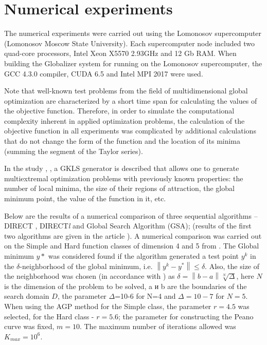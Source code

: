 \documentclass{svproc}
\begin{document}
\section{Numerical experiments}

The numerical experiments were carried out using the Lomonosov supercomputer (Lomonosov Moscow State University). Each supercomputer node included two quad-core processors, Intel Xeon X5570 2.93GHz and 12 Gb RAM. When building the Globalizer system for running on the Lomonosov supercomputer, the GCC 4.3.0 compiler, CUDA 6.5 and Intel MPI 2017 were used.

Note that well-known test problems from the field of multidimensional global optimization are characterized by a short time span for calculating the values of the objective function. Therefore, in order to simulate the computational complexity inherent in applied optimization problems, the calculation of the objective function in all experiments was complicated by additional calculations that do not change the form of the function and the location of its minima (summing the segment of the Taylor series).

In the study \cite{Gaviano2003}, \cite{Ref16}, a GKLS generator is described that allows one to generate multiextremal optimization problems with previously known properties: the number of local minima, the size of their regions of attraction, the global minimum point, the value of the function in it, etc.

Below are the results of a numerical comparison of three sequential algorithms -- DIRECT \cite{Jones2009}, DIRECT\textit{l} \cite{Gablonsky2001} and Global Search Algorithm (GSA); (results of the first two algorithms are given in the article \cite{Sergeyev2006}). A numerical comparison was carried out on the Simple and Hard function classes of dimension 4 and 5 from \cite{Sergeyev2006}. The Global minimum $y*$ was considered found if the algorithm generated a test point $y^k$ in the $\delta$-neighborhood of the global minimum, i.e. $\left\| {{y}^{k}}-{{y}^{*}} \right\|\le \delta $. Also, the size of the neighborhood was chosen (in accordance with \cite{Sergeyev2006}) as $\delta =\left\| b-a \right\|\sqrt[N]{\Delta }$, here $N$ is the dimension of the problem to be solved, a и b are the boundaries of the search domain $D$, the parameter  $\Delta $=10-6 for N=4 and $\Delta =10-7$ for $N=5$. When using the AGP method for the Simple class, the parameter $r=4.5$ was selected, for the Hard class - $r=5.6$; the parameter for constructing the Peano curve was fixed, $m=10$. The maximum number of iterations allowed was $K_{max} = 10^6$. 
\end{document}
